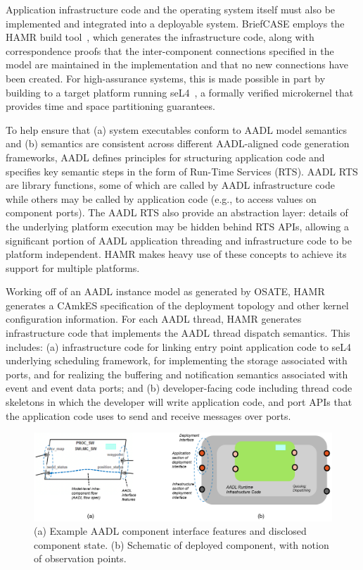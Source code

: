 Application infrastructure code and the operating system itself must also be implemented and integrated into a deployable system.  BriefCASE employs the HAMR build tool~\cite{hamr}, which generates the infrastructure code, along with correspondence proofs that the inter-component connections specified in the model are maintained in the implementation and that no new connections have been created.  For high-assurance systems, this is made possible in part by building to a target platform running seL4~\cite{sel4-cacm18}, a formally verified microkernel that provides time and space partitioning guarantees.

To help ensure that (a) system executables conform to AADL model semantics and (b) semantics are consistent across different AADL-aligned code generation frameworks, AADL defines principles for structuring application code and specifies key semantic steps in the form of Run-Time Services (RTS). AADL RTS are library functions, some of which are called by AADL infrastructure code while others may be called by application code (e.g., to access values on component ports). The AADL RTS also provide an abstraction layer: details of the underlying platform execution may be hidden behind RTS APIs, allowing a significant portion of AADL application threading and infrastructure code to be platform independent. HAMR makes heavy use of these concepts to achieve its support for multiple platforms.

Working off of an AADL instance model as generated by OSATE, HAMR generates a CAmkES specification of
the deployment topology and other kernel configuration information. For each AADL thread, HAMR generates infrastructure code that implements the AADL thread dispatch semantics. This includes: (a) infrastructure
code for linking entry point application code to seL4 underlying scheduling framework, for implementing the storage associated with ports, and for realizing the buffering and notification semantics associated with event and event data ports; and (b) developer-facing code including thread code skeletons in which the developer will write application code, and port APIs that the application code uses to
send and receive messages over ports.

\begin{figure}[h] 
	\centering 
	\includegraphics[width=\textwidth]{figs/deployment-interface.png}
	\caption{(a) Example AADL component interface features and disclosed component state. (b) Schematic of deployed component, with notion of observation points.}
	\label{fig:deployment-interface} 
\end{figure}

